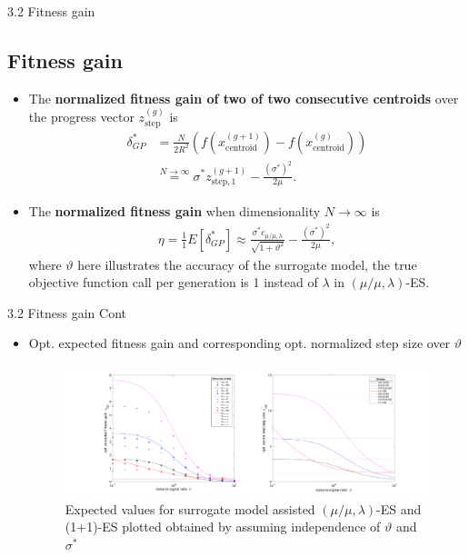 \documentclass{beamer}
\begin{document}

\begin{frame}{3.2 Fitness gain}
\subsection{Fitness gain}
\begin{itemize}
    \item The \textbf{normalized fitness gain of two of two consecutive centroids} over the progress vector $z_{\text{step}}^{(g)}$ is
    \begin{align}
        \delta_{GP}^* &=  \frac{N}{2R^2}\left( f( x_{\text{centroid}}^{(g+1)} ) - f( x_{\text{centroid}}^{(g)} ) \right)  \nonumber\\ 
        &\overset{N \rightarrow \infty}{=} \sigma^* z_{\text{step},1}^{(g+1)}   - \frac{(\sigma^*)^2}{2 \mu}.\nonumber  
    \end{align}
    \item The \textbf{normalized fitness gain} when dimensionality $N \rightarrow \infty$ is 
    \begin{align}\label{eqn:eta_surrogate}{}
        \eta = \frac{1}{1}E[ \delta_{GP}^*] \approx  \frac{\sigma^* c_{\mu / \mu, \lambda}}{\sqrt {1+ \vartheta^2}} - \frac{(\sigma^*)^2}{2 \mu} ,\nonumber 
    \end{align}
    where $\vartheta$ here illustrates the accuracy of the surrogate model, the true objective function call per generation is 1 instead of $\lambda$ in $(\mu/\mu,\lambda)$-ES.
\end{itemize} 

\end{frame}

\begin{frame}{3.2 Fitness gain Cont}
\begin{itemize}
    \item Opt. expected fitness gain and corresponding opt. normalized step size over $\vartheta$


\begin{figure}
\includegraphics[width=1.0\linewidth]{opt_stepSize_fitGain_final.pdf}
    \caption{Expected values for surrogate model assisted $(\mu/\mu,\lambda)$-ES and (1+1)-ES plotted obtained by assuming independence of $\vartheta$ and $\sigma^*$}
\end{figure}
\end{itemize} 
\end{frame}
\end{document}

